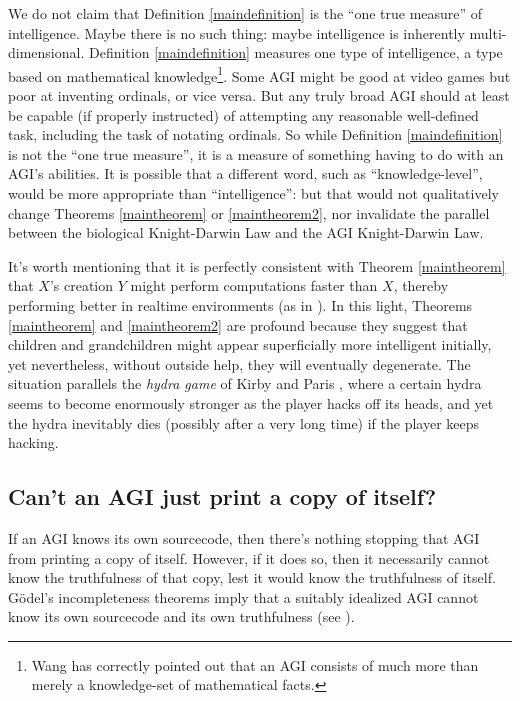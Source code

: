 \documentclass[runningheads]{llncs}
\begin{document}
We do not claim that Definition \ref{maindefinition} is the ``one true measure'' of
intelligence. Maybe there is no such thing: maybe intelligence is inherently
multi-dimensional. Definition \ref{maindefinition} measures one type of
intelligence, a type based on mathematical knowledge\footnote{Wang has
correctly pointed out \cite{wang2007} that an AGI consists of much more than merely
a knowledge-set of mathematical facts.}. Some AGI might be good at video games
but poor at inventing ordinals,
or vice versa. But any truly broad AGI should at least be capable (if properly
instructed) of attempting any reasonable well-defined task, including the task of
notating ordinals.
So while Definition \ref{maindefinition} is not the ``one true measure'', it is a
measure of something having to do with an AGI's abilities. It is possible that
a different word, such as
``knowledge-level'', would be more appropriate than ``intelligence'': but
that would not qualitatively change
Theorems \ref{maintheorem} or \ref{maintheorem2}, nor
invalidate the parallel between the biological Knight-Darwin Law and the
AGI Knight-Darwin Law.

It's worth mentioning that it is perfectly consistent with
Theorem \ref{maintheorem} that $X$'s creation $Y$ might perform computations faster
than $X$, thereby performing better in realtime environments (as in \cite{gavane}).
In this light, Theorems \ref{maintheorem} and \ref{maintheorem2} are profound because
they suggest that children and grandchildren might appear superficially more intelligent
initially, yet nevertheless, without outside help, they will eventually degenerate.
The situation parallels the \emph{hydra game} of
Kirby and Paris \cite{kirby1982accessible}, where a certain hydra
seems to become enormously stronger as the player hacks off its heads, and yet
the hydra inevitably dies (possibly after a very long time) if the player keeps hacking.

\subsection{Can't an AGI just print a copy of itself?}

If an AGI knows its own sourcecode, then there's nothing stopping that
AGI from printing a copy of itself.
However, if it does so, then it necessarily cannot know the truthfulness of that
copy, lest it would know the truthfulness of itself.
G\"odel's incompleteness theorems imply that a suitably idealized AGI cannot know
its own sourcecode
and its own truthfulness (see \cite{alexander2014machine}).
\end{document}
